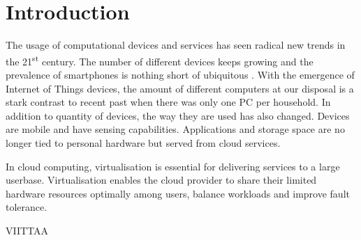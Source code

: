 \section{Introduction}

The usage of computational devices and services has seen radical new trends in the 21\textsuperscript{st} century. The number of different devices keeps growing and the prevalence of smartphones is nothing short of ubiquitous \cite{anderson2015technology}. With the emergence of Internet of Things devices, the amount of different computers at our disposal is a stark contrast to recent past when there was only one PC per household. In addition to quantity of devices, the way they are used has also changed. Devices are mobile and have sensing capabilities. Applications and storage space are no longer tied to personal hardware but served from cloud services.

In cloud computing, virtualisation is essential for delivering services to a large userbase. Virtualisation enables the cloud provider to share their limited hardware resources optimally among users, balance workloads and improve fault tolerance.


VIITTAA \cite{stateofthecloud}